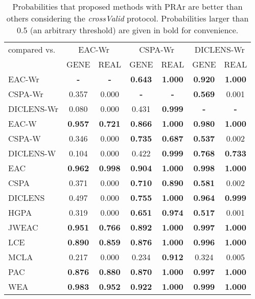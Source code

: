 \begin{table}
	\centering
		\caption{Probabilities that proposed methods with PRAr are better than others considering the \emph{crossValid} protocol. Probabilities larger than 0.5 (an arbitrary threshold) are given in bold for convenience.}
		\label{tab:bayescomp:crossValid}
		\begin{tabular*}{1.0\linewidth}{@{\extracolsep{\fill}} l c c c c c c }
			\toprule
			{compared vs.} & \multicolumn{2}{c}{EAC-Wr} & \multicolumn{2}{c}{CSPA-Wr} & \multicolumn{2}{c}{DICLENS-Wr}\\ 
			\cmidrule(lr){2-3}
			\cmidrule(lr){4-5}
			\cmidrule(lr){6-7}
			 & \multicolumn{1}{c}{GENE} & \multicolumn{1}{c}{REAL} & \multicolumn{1}{c}{GENE} & \multicolumn{1}{c}{REAL} & \multicolumn{1}{c}{GENE} & \multicolumn{1}{c}{REAL} \\ \midrule
			EAC-Wr& \textbf{-} & \textbf{-}  & \textbf{0.643} & \textbf{1.000} & \textbf{0.920} & \textbf{1.000}\\
			CSPA-Wr & 0.357 & 0.000& \textbf{-} & \textbf{-}  & \textbf{0.569} & 0.001\\
			DICLENS-Wr & 0.080 & 0.000 & 0.431 & \textbf{0.999}& \textbf{-} & \textbf{-} \\
			EAC-W & \textbf{0.957} & \textbf{0.721} & \textbf{0.866} & \textbf{1.000} & \textbf{0.980} & \textbf{1.000}\\
			CSPA-W & 0.346 & 0.000 & \textbf{0.735} & \textbf{0.687} & \textbf{0.537} & 0.002\\
			DICLENS-W & 0.104 & 0.000 & 0.422 & \textbf{0.999} & \textbf{0.768} & \textbf{0.733}\\
			EAC & \textbf{0.962} & \textbf{0.998} & \textbf{0.904} & \textbf{1.000} & \textbf{0.998} & \textbf{1.000}\\
			CSPA & 0.371 & 0.000 & \textbf{0.710} & \textbf{0.890} & \textbf{0.581} & 0.002\\
			DICLENS & 0.497 & 0.000 & \textbf{0.755} & \textbf{1.000} & \textbf{0.964} & \textbf{0.999}\\
			HGPA & 0.319 & 0.000 & \textbf{0.651} & \textbf{0.974} & \textbf{0.517} & 0.001\\
			JWEAC & \textbf{0.951} & \textbf{0.766} & \textbf{0.892} & \textbf{1.000} & \textbf{0.997} & \textbf{1.000}\\
			LCE & \textbf{0.890} & \textbf{0.859} & \textbf{0.876} & \textbf{1.000} & \textbf{0.996} & \textbf{1.000}\\
			MCLA & 0.217 & 0.000 & 0.234 & \textbf{0.912} & 0.324 & 0.005\\
			PAC & \textbf{0.876} & \textbf{0.880} & \textbf{0.870} & \textbf{1.000} & \textbf{0.997} & \textbf{1.000}\\
			WEA & \textbf{0.983} & \textbf{0.952} & \textbf{0.922} & \textbf{1.000} & \textbf{0.999} & \textbf{1.000}\\
			\bottomrule
		\end{tabular*}
\end{table}
